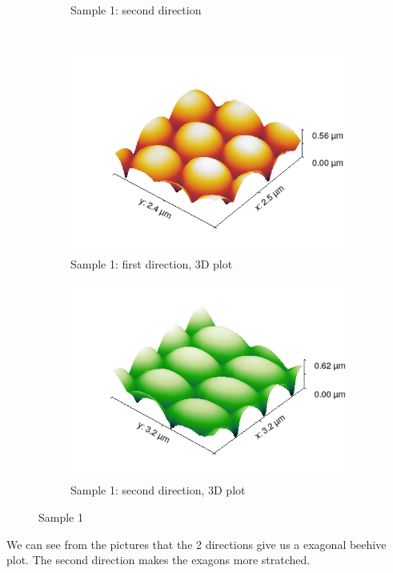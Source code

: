\documentclass[11pt,a4paper]{article}
\begin{document}
\begin{figure}[H]
\begin{subfigure}[b]{0.45\textwidth}
\caption{Sample 1: second direction}
\label{fig:}
\end{subfigure}\\\vspace{.2cm}
\begin{subfigure}[b]{0.45\textwidth}
\includegraphics[width=\textwidth]{sm_sample1_3D}
\caption{Sample 1: first direction, 3D plot}
\label{fig:}
\end{subfigure}
\begin{subfigure}[b]{0.45\textwidth}
\includegraphics[width=\textwidth]{sm_sample1_dir2_3D}
\caption{Sample 1: second direction, 3D plot}
\label{fig:}
\end{subfigure}
\caption{Sample 1}
\end{figure}

We can see from the pictures that the 2 directions give us a exagonal beehive plot. The second direction makes the exagons more stratched.%
\end{document}
